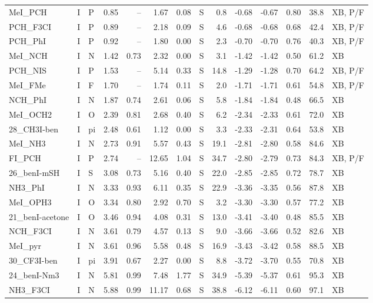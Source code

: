 {\begin{longtable}{lllrrrrlrrrrrl}
MeI\_PCH & I & P & 0.85 & -- & 1.67 & 0.08 & S & 0.8 & -0.68 & -0.67 & 0.80 & 38.8 & XB, P/F\\
PCH\_F3CI & I & P & 0.89 & -- & 2.18 & 0.09 & S & 4.6 & -0.68 & -0.68 & 0.68 & 42.4 & XB, P/F\\
PCH\_PhI & I & P & 0.92 & -- & 1.80 & 0.00 & S & 2.3 & -0.70 & -0.70 & 0.76 & 40.3 & XB, P/F\\
MeI\_NCH & I & N & 1.42 & 0.73 & 2.32 & 0.00 & S & 3.1 & -1.42 & -1.42 & 0.50 & 61.2 & XB\\
PCH\_NIS & I & P & 1.53 & -- & 5.14 & 0.33 & S & 14.8 & -1.29 & -1.28 & 0.70 & 64.2 & XB, P/F\\
MeI\_FMe & I & F & 1.70 & -- & 1.74 & 0.11 & S & 2.0 & -1.71 & -1.71 & 0.61 & 54.8 & XB, P/F\\
NCH\_PhI & I & N & 1.87 & 0.74 & 2.61 & 0.06 & S & 5.8 & -1.84 & -1.84 & 0.48 & 66.5 & XB\\
MeI\_OCH2 & I & O & 2.39 & 0.81 & 2.68 & 0.40 & S & 6.2 & -2.34 & -2.33 & 0.61 & 72.0 & XB\\
28\_CH3I-ben & I & pi & 2.48 & 0.61 & 1.12 & 0.00 & S & 3.3 & -2.33 & -2.31 & 0.64 & 53.8 & XB\\
MeI\_NH3 & I & N & 2.73 & 0.91 & 5.57 & 0.43 & S & 19.1 & -2.81 & -2.80 & 0.58 & 84.6 & XB\\
FI\_PCH & I & P & 2.74 & -- & 12.65 & 1.04 & S & 34.7 & -2.80 & -2.79 & 0.73 & 84.3 & XB, P/F\\
26\_benI-mSH & I & S & 3.08 & 0.73 & 5.16 & 0.40 & S & 22.0 & -2.85 & -2.85 & 0.72 & 78.7 & XB\\
NH3\_PhI & I & N & 3.33 & 0.93 & 6.11 & 0.35 & S & 22.9 & -3.36 & -3.35 & 0.56 & 87.8 & XB\\
MeI\_OPH3 & I & O & 3.34 & 0.80 & 2.92 & 0.70 & S & 3.2 & -3.30 & -3.30 & 0.57 & 77.2 & XB\\
21\_benI-acetone & I & O & 3.46 & 0.94 & 4.08 & 0.31 & S & 13.0 & -3.41 & -3.40 & 0.48 & 85.5 & XB\\
NCH\_F3CI & I & N & 3.61 & 0.79 & 4.57 & 0.13 & S & 9.0 & -3.66 & -3.66 & 0.52 & 82.6 & XB\\
MeI\_pyr & I & N & 3.61 & 0.96 & 5.58 & 0.48 & S & 16.9 & -3.43 & -3.42 & 0.58 & 88.5 & XB\\
30\_CF3I-ben & I & pi & 3.91 & 0.67 & 2.27 & 0.00 & S & 8.8 & -3.72 & -3.70 & 0.55 & 70.8 & XB\\
24\_benI-Nm3 & I & N & 5.81 & 0.99 & 7.48 & 1.77 & S & 34.9 & -5.39 & -5.37 & 0.61 & 95.3 & XB\\
NH3\_F3CI & I & N & 5.88 & 0.99 & 11.17 & 0.68 & S & 38.8 & -6.12 & -6.11 & 0.60 & 97.1 & XB\\

\end{longtable}}
